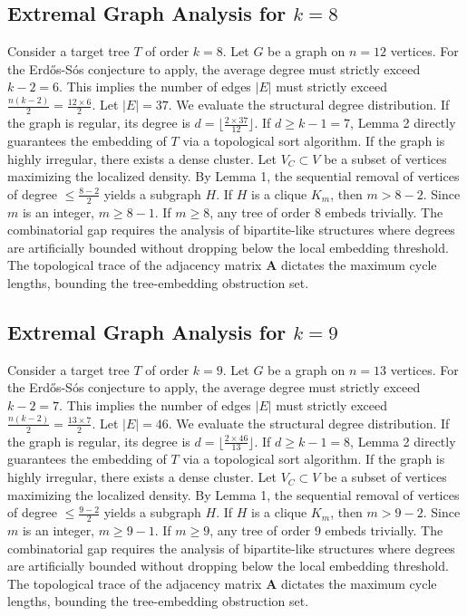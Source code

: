 \documentclass[11pt,a4paper]{article}
\begin{document}
\subsection{Extremal Graph Analysis for $k=8$}
Consider a target tree $T$ of order $k=8$.
Let $G$ be a graph on $n=12$ vertices.
For the Erd\H{o}s-S\'os conjecture to apply, the average degree must strictly exceed $k-2 = 6$.
This implies the number of edges $|E|$ must strictly exceed $\frac{n(k-2)}{2} = \frac{12 \times 6}{2}$.
Let $|E| = 37$.
We evaluate the structural degree distribution. If the graph is regular, its degree is $d = \lfloor \frac{2 \times 37}{12} \rfloor$.
If $d \geq k-1 = 7$, Lemma 2 directly guarantees the embedding of $T$ via a topological sort algorithm.
If the graph is highly irregular, there exists a dense cluster. Let $V_C \subset V$ be a subset of vertices maximizing the localized density.
By Lemma 1, the sequential removal of vertices of degree $\leq \frac{8-2}{2}$ yields a subgraph $H$.
If $H$ is a clique $K_{m}$, then $m > 8-2$. Since $m$ is an integer, $m \geq 8-1$. If $m \geq 8$, any tree of order $8$ embeds trivially.
The combinatorial gap requires the analysis of bipartite-like structures where degrees are artificially bounded without dropping below the local embedding threshold. The topological trace of the adjacency matrix $\mathbf{A}$ dictates the maximum cycle lengths, bounding the tree-embedding obstruction set.


\subsection{Extremal Graph Analysis for $k=9$}
Consider a target tree $T$ of order $k=9$.
Let $G$ be a graph on $n=13$ vertices.
For the Erd\H{o}s-S\'os conjecture to apply, the average degree must strictly exceed $k-2 = 7$.
This implies the number of edges $|E|$ must strictly exceed $\frac{n(k-2)}{2} = \frac{13 \times 7}{2}$.
Let $|E| = 46$.
We evaluate the structural degree distribution. If the graph is regular, its degree is $d = \lfloor \frac{2 \times 46}{13} \rfloor$.
If $d \geq k-1 = 8$, Lemma 2 directly guarantees the embedding of $T$ via a topological sort algorithm.
If the graph is highly irregular, there exists a dense cluster. Let $V_C \subset V$ be a subset of vertices maximizing the localized density.
By Lemma 1, the sequential removal of vertices of degree $\leq \frac{9-2}{2}$ yields a subgraph $H$.
If $H$ is a clique $K_{m}$, then $m > 9-2$. Since $m$ is an integer, $m \geq 9-1$. If $m \geq 9$, any tree of order $9$ embeds trivially.
The combinatorial gap requires the analysis of bipartite-like structures where degrees are artificially bounded without dropping below the local embedding threshold. The topological trace of the adjacency matrix $\mathbf{A}$ dictates the maximum cycle lengths, bounding the tree-embedding obstruction set.
\end{document}
